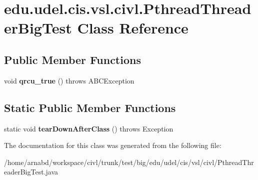 \hypertarget{classedu_1_1udel_1_1cis_1_1vsl_1_1civl_1_1PthreadThreaderBigTest}{}\section{edu.\+udel.\+cis.\+vsl.\+civl.\+Pthread\+Threader\+Big\+Test Class Reference}
\label{classedu_1_1udel_1_1cis_1_1vsl_1_1civl_1_1PthreadThreaderBigTest}
\subsection*{Public Member Functions}
\begin{DoxyCompactItemize}
\item 
\hypertarget{classedu_1_1udel_1_1cis_1_1vsl_1_1civl_1_1PthreadThreaderBigTest_a6bbe46150d2d5082cfb012426e327bfe}{}void {\bfseries qrcu\+\_\+true} ()  throws A\+B\+C\+Exception \label{classedu_1_1udel_1_1cis_1_1vsl_1_1civl_1_1PthreadThreaderBigTest_a6bbe46150d2d5082cfb012426e327bfe}

\end{DoxyCompactItemize}
\subsection*{Static Public Member Functions}
\begin{DoxyCompactItemize}
\item 
\hypertarget{classedu_1_1udel_1_1cis_1_1vsl_1_1civl_1_1PthreadThreaderBigTest_ac2b84f9f904c24494018c9ec99cede96}{}static void {\bfseries tear\+Down\+After\+Class} ()  throws Exception \label{classedu_1_1udel_1_1cis_1_1vsl_1_1civl_1_1PthreadThreaderBigTest_ac2b84f9f904c24494018c9ec99cede96}

\end{DoxyCompactItemize}


The documentation for this class was generated from the following file\+:\begin{DoxyCompactItemize}
\item 
/home/arnabd/workspace/civl/trunk/test/big/edu/udel/cis/vsl/civl/Pthread\+Threader\+Big\+Test.\+java\end{DoxyCompactItemize}
